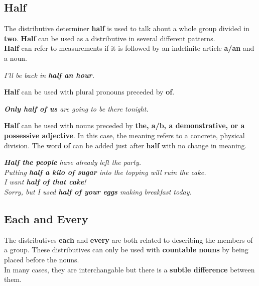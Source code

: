 \documentclass[10pt,a4paper]{article}
\begin{document}
\subsection{Half}
The distributive determiner \textbf{half} is used to talk about a whole group divided in \textbf{two}. \textbf{Half} can be used as a distributive in several different patterns.\\
\textbf{Half} can refer to measurements if it is followed by an indefinite article \textbf{a/an} and a noun.
\begin{center}
\textit{I'll be back in \textbf{half an hour}.}
\end{center}
\textbf{Half} can be used with plural pronouns preceded by \textbf{of}.
\begin{center}
\textit{ \textbf{Only half of us} are going to be there tonight.}
\end{center}
\textbf{Half} can be used with nouns preceded by \textbf{the, a/b, a demonstrative, or a possessive adjective}. In this case, the meaning refers to a concrete, physical division.
The word \textbf{of} can be added just after \textbf{half} with no change in meaning.
\begin{center}
\textit{ \textbf{Half the people} have already left the party.\\
Putting \textbf{half a kilo of sugar} into the topping will ruin the cake.\\
I want \textbf{half of that cake}!\\
Sorry, but I used \textbf{half of your eggs} making breakfast today.}
\end{center}

\subsection{Each and Every}
The distributives \textbf{each} and \textbf{every} are both related to describing the members of a group. These distributives can only be used with \textbf{countable nouns} by being placed before the nouns. \\
\indent In many cases, they are interchangable but there is a \textbf{subtle difference} between them.
\end{document}
